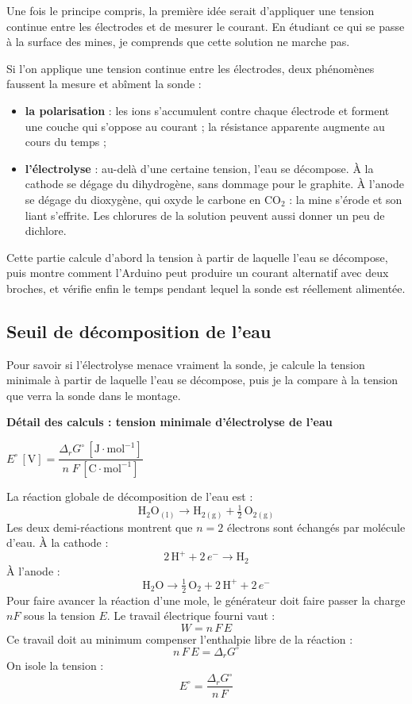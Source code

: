 \documentclass[11pt,a4paper]{article}
\newcommand{\resultat}[1]{\begin{center}{\large\color{bleuENO}$\displaystyle #1$}\end{center}}
\newenvironment{demo}[2]{\par\medskip\noindent\textbf{Détail des calculs : #1}\par\nopagebreak\resultat{#2}}{\par\medskip}
\begin{document}
Une fois le principe compris, la première idée serait d'appliquer une tension continue entre les électrodes et de mesurer le courant. En étudiant ce qui se passe à la surface des mines, je comprends que cette solution ne marche pas.


Si l'on applique une tension continue entre les électrodes, deux phénomènes faussent la mesure et abîment la sonde :
\begin{itemize}[nosep]
\item \textbf{la polarisation} : les ions s'accumulent contre chaque électrode et forment une couche qui s'oppose au courant ; la résistance apparente augmente au cours du temps ;
\item \textbf{l'électrolyse} : au-delà d'une certaine tension, l'eau se décompose. À la cathode se dégage du dihydrogène, sans dommage pour le graphite. À l'anode se dégage du dioxygène, qui oxyde le carbone en $\mathrm{CO_2}$ : la mine s'érode et son liant s'effrite. Les chlorures de la solution peuvent aussi donner un peu de dichlore.
\end{itemize}

Cette partie calcule d'abord la tension à partir de laquelle l'eau se décompose, puis montre comment l'Arduino peut produire un courant alternatif avec deux broches, et vérifie enfin le temps pendant lequel la sonde est réellement alimentée.

\subsection{Seuil de décomposition de l'eau}

Pour savoir si l'électrolyse menace vraiment la sonde, je calcule la tension minimale à partir de laquelle l'eau se décompose, puis je la compare à la tension que verra la sonde dans le montage.


\begin{demo}{tension minimale d'électrolyse de l'eau}{E^\circ\,[\mathrm{V}] = \dfrac{\Delta_r G^\circ\,[\mathrm{J \cdot mol^{-1}}]}{n \; F\,[\mathrm{C \cdot mol^{-1}}]}}
La réaction globale de décomposition de l'eau est :
\[
\mathrm{H_2O_{(l)}} \longrightarrow \mathrm{H_{2(g)}} + \tfrac{1}{2} \, \mathrm{O_{2(g)}}
\]
Les deux demi-réactions montrent que $n = 2$ électrons sont échangés par molécule d'eau. À la cathode :
\[
2 \, \mathrm{H^+} + 2 \, e^- \longrightarrow \mathrm{H_2}
\]
À l'anode :
\[
\mathrm{H_2O} \longrightarrow \tfrac{1}{2} \, \mathrm{O_2} + 2 \, \mathrm{H^+} + 2 \, e^-
\]
Pour faire avancer la réaction d'une mole, le générateur doit faire passer la charge $n F$ sous la tension $E$. Le travail électrique fourni vaut :
\[
W = n \, F \, E
\]
Ce travail doit au minimum compenser l'enthalpie libre de la réaction :
\[
n \, F \, E = \Delta_r G^\circ
\]
On isole la tension :
\[
E^\circ = \frac{\Delta_r G^\circ}{n \, F}
\]
\end{demo}
\end{document}
